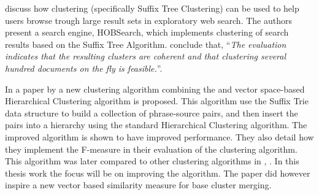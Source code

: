 \cite{gulla2008contextualized} discuss how clustering (specifically Suffix Tree Clustering) can be used to help users browse trough large result sets in exploratory web search. The authors present a search engine, HOBSearch, which implements clustering of search results based on the Suffix Tree Algorithm. \citeauthor[21]{gulla2008contextualized} conclude that, ``\textit{The evaluation indicates that the resulting clusters are coherent and that clustering several hundred documents on the fly is feasible.}''.

In a paper by \cite{Chim2007} a new clustering algorithm combining the \STC and vector space-based Hierarchical Clustering algorithm is proposed. This algorithm use the Suffix Trie data structure to build a collection of phrase-source pairs, and then insert the pairs into a hierarchy using the standard Hierarchical Clustering algorithm. The improved algorithm is shown to have improved performance. They also detail how they implement the F-measure in their evaluation of the clustering algorithm. This algorithm was later compared to other clustering algorithms in , \cite{Chim2008}. In this thesis work the focus will be on improving the \CTC algorithm. The paper did however inspire a new vector based similarity measure for base cluster merging.